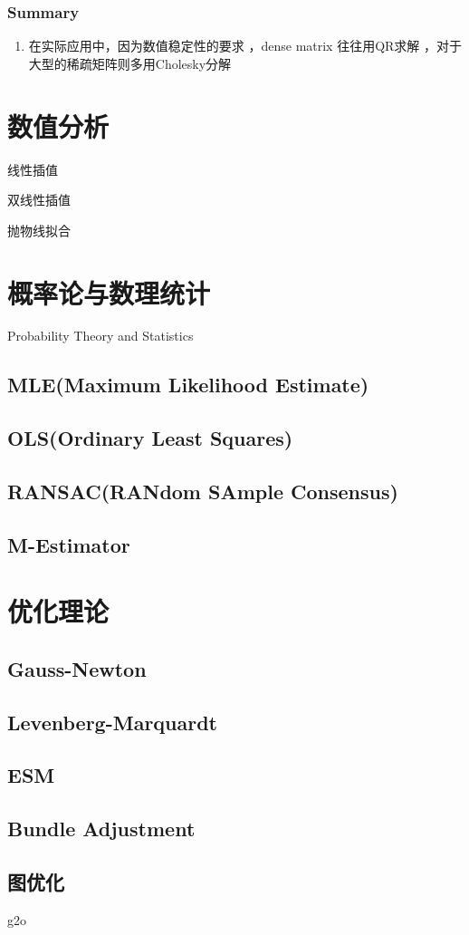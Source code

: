 \subsubsection{Summary}
\begin{enumerate}
\item 在实际应用中，因为数值稳定性的要求 ，dense matrix 往往用QR求解 ，对于 大型的稀疏矩阵则多用Cholesky分解
\end{enumerate}


\section{数值分析}

线性插值  

双线性插值  

抛物线拟合  


\section{概率论与数理统计}

Probability Theory and Statistics

\subsection{MLE(Maximum Likelihood Estimate)}
\subsection{OLS(Ordinary Least Squares)}
\subsection{RANSAC(RANdom SAmple Consensus)}
\subsection{M-Estimator}


\section{优化理论}

\subsection{Gauss-Newton}
\subsection{Levenberg-Marquardt}
\subsection{ESM}
\subsection{Bundle Adjustment}
\subsection{图优化}
g2o